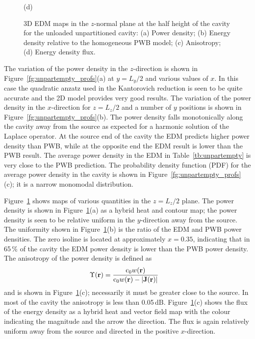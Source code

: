 \documentclass[a4paper]{article}
\numberwithin{equation}{section}
\newcounter{Table}
\newcounter{Figure}
\begin{document}
\begin{figure}[hp]
\begin{center}
{\footnotesize (d)}\\
\vspace{-2mm}
\caption{\label{fg:unpartempty_maps} 3D EDM maps in the $z$-normal plane at the half height of the cavity for the 
unloaded unpartitioned cavity: (a) Power density; (b) Energy density relative to the homogeneous PWB model;
(c) Anisotropy; (d) Energy density flux.}
\end{center}
\end{figure}

The variation of the power density in the $z$-direction is shown in Figure~\ref{fg:unpartempty_profs}(a)
at $y=L_y/2$ and various values of $x$. In this case the quadratic anzatz used in the Kantorovich reduction
is seen to be quite accurate and the 2D model provides very good results. The variation of the power density 
in the $x$-direction for $z=L_z/2$ and a number of $y$ positions is shown in Figure~\ref{fg:unpartempty_profs}(b).
The power density falls monotonically along the cavity away from the source as expected for a harmonic solution
of the Laplace operator. At the source end of the cavity the EDM predicts higher power density than PWB, while 
at the opposite end the EDM result is lower than the PWB result. The average power density in the EDM in 
Table~\ref{tb:unpartempty} is very close to the PWB prediction. The probability density function (PDF)
for the average power density in the cavity is shown in Figure~\ref{fg:unpartempty_profs}(c); it is a narrow
monomodal distribution.

Figure~\ref{fg:unpartempty_maps} shows maps of various quantities in the $z=L_z/2$ plane. The power density is
shown in Figure~\ref{fg:unpartempty_maps}(a) as a hybrid heat and contour map; the power density is seen to
be relative uniform in the $y$-direction away from the source. The uniformity shown in Figure~\ref{fg:unpartempty_maps}(b)
is the ratio of the EDM and PWB power densities. The zero isoline is located at approximately $x=0.35$, indicating that in 65\,\% of 
the cavity the EDM power density is lower than the PWB power density. The anisotropy of the power density is defined as 
\begin{align}
\Upsilon(\boldsymbol{\mathrm{r}}) &= \frac{\mathrm{c}_0 w(\boldsymbol{\mathrm{r}})}{\mathrm{c}_0 w(\boldsymbol{\mathrm{r}}) - |\boldsymbol{\mathrm{J}}(\boldsymbol{\mathrm{r}})|} 
\end{align}
and is shown in Figure~\ref{fg:unpartempty_maps}(c); necessarily it must be greater close to the source. In most of the 
cavity the anisotropy is less than 0.05\,dB. Figure~\ref{fg:unpartempty_maps}(c) shows the flux of the energy density 
as a hybrid heat and vector
field map with the colour indicating the magnitude and the arrow the direction. The flux is again relatively uniform away from 
the source and directed in the positive $x$-direction. 
\end{document}
